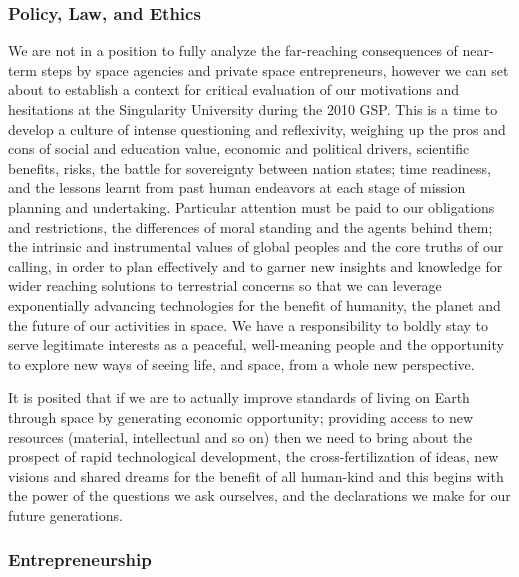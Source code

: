 \subsubsection{Policy, Law, and Ethics}

We are not in a position to fully analyze the far-reaching consequences of near-term steps by space agencies and private space entrepreneurs, however we can set about to establish a  context for critical evaluation of our motivations and hesitations at the Singularity University during the 2010 GSP. This is a time to develop a culture of intense questioning and reflexivity, weighing up the pros and cons of social and education value, economic and political drivers, scientific benefits, risks, the battle for sovereignty between nation states; time readiness, and the lessons learnt from past human endeavors at each stage of mission  planning and undertaking. Particular attention must be paid to our obligations and restrictions, the differences of moral standing and the agents behind them; the intrinsic and instrumental values of global peoples and the core truths of our calling, in order to plan effectively and to garner new insights and knowledge for wider reaching solutions to terrestrial concerns so that we can leverage exponentially advancing technologies for the benefit of humanity, the  planet and the future of our activities in space. We have a responsibility to boldly stay to serve legitimate interests as a peaceful, well-meaning people and the opportunity to explore new ways of seeing life, and space, from a whole new perspective. 

It is posited that if we are to actually improve standards of living on Earth through space by  generating economic opportunity; providing access to new resources (material, intellectual and so on) then we need to bring about the prospect of rapid technological development, the cross-fertilization of ideas, new visions and shared dreams for the benefit of all human-kind and this begins with the power of the questions we ask ourselves, and the declarations we make for our future generations. 

\subsubsection{Entrepreneurship}

